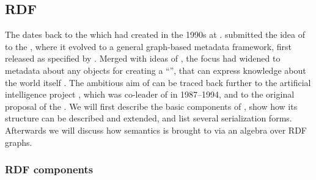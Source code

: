 \subsection{RDF}
\label{sec:rdf}

The  dates back to the
 which 
had created in the 1990s at  \cite{Andreessen1999,Guha1996}.
\textcite{Guha1997} submitted the idea of  to the , where 
it evolved to a general graph-based metadata framework, first released as 
 specified by \textcite{Lassila1999}. Merged with ideas of 
\textcite{TBL1997}, the focus had widened to metadata about any objects for
creating a ``'', that can express knowledge
about the world itself \cite{BernersLee2001a}. The ambitious aim of 
can be traced back further to the artificial intelligence project ,
which  was co-leader of in 1987--1994, and to
the original proposal of the  \cite{BernersLee1989}.
We will first describe the basic components of , show how its 
structure can be described and extended, and list several serialization forms.
Afterwards we will discuss how semantics is brought to  via an
algebra over RDF graphs.

\subsubsection{RDF components}

